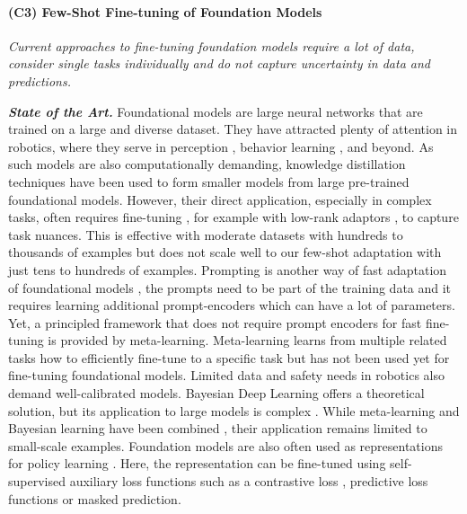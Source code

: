 \documentclass{erc-B2}
\begin{document}
\paragraph{(C3) Few-Shot Fine-tuning of Foundation Models} 
\textit{Current approaches to fine-tuning foundation models require a lot of data, consider single tasks individually and do not capture uncertainty in data and predictions.}

\textit{\textbf{State of the Art.}} Foundational models \cite{bommasani2022opportunities} are large neural networks that are trained on a large and diverse dataset.
They have attracted plenty of attention in robotics, where they serve in perception \cite{Radosavovic2022mvp, karamcheti2023voltron, SAM}, behavior learning \cite{rt12022arxiv, rt22023arxiv, rtx2023arxiv}, and beyond. As such models are also computationally demanding, knowledge distillation techniques \cite{Sun_2023_ICCV} have been used to form smaller models from large pre-trained foundational models. However, their direct application, especially in complex tasks, often requires fine-tuning \cite{yang2023foundation}, for example with low-rank adaptors \cite{hu2022lora}, to capture task nuances. 
This is effective with moderate datasets with hundreds to thousands of examples but does not scale well to our few-shot adaptation with just tens to hundreds of examples. Prompting is another way of fast adaptation of foundational models \cite{SAM}, the prompts need to be part of the training data and it requires learning additional prompt-encoders which can have a lot of parameters. 
Yet, a principled framework that does not require prompt encoders for fast fine-tuning is provided by meta-learning. Meta-learning learns from multiple related tasks how to efficiently fine-tune to a specific task \cite{finn2017model, garnelo12018np} but has not been used yet for fine-tuning foundational models. Limited data and safety needs in robotics also demand well-calibrated models. Bayesian Deep Learning \cite{wilson2020bayesian} offers a theoretical solution, but its application to large models is complex \cite{seligmann2023beyond}. While meta-learning and Bayesian learning have been combined \cite{garnelo12018np, volpp2021bayesian, Volpp23}, their application remains limited to small-scale examples. 
Foundation models are also often used as representations for policy learning \cite{yang2023foundation}. Here, the representation can be fine-tuned using self-supervised auxiliary loss functions such as a contrastive loss \cite{laskin20a}, predictive loss functions \cite{ContrastivePredictive,Becker2023archive} or masked prediction\cite{liu2022masked, Radosavovic2022mvp}.
\end{document}
